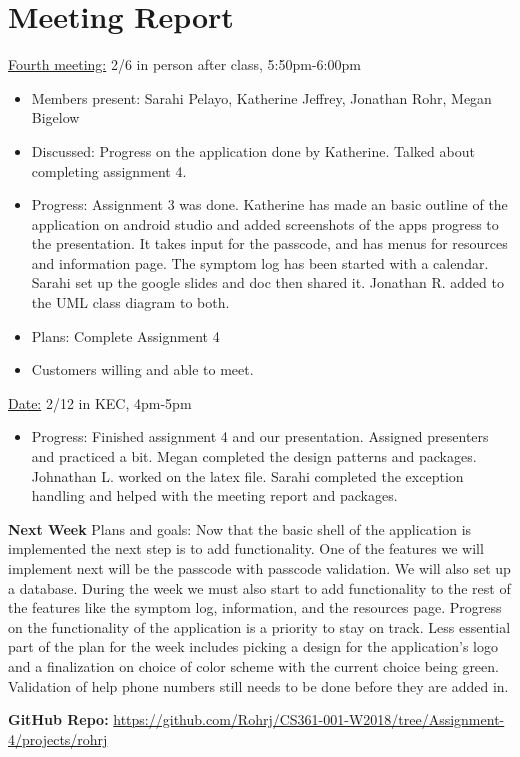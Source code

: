 \documentclass[letterpaper,12pt,titlepage]{article}
\begin{document}
\newpage
\section{Meeting Report}
\underline{Fourth meeting:} 2/6 in person after class, 5:50pm-6:00pm
\begin{itemize}
\item Members present: Sarahi Pelayo, Katherine Jeffrey, Jonathan Rohr, Megan Bigelow
\item Discussed: Progress on the application done by Katherine. Talked about completing assignment 4.
\item Progress: Assignment 3 was done. Katherine has made an basic outline of the application on android studio and added screenshots of the apps progress to the presentation. It takes input for the passcode, and has menus for resources and information page. The symptom log has been started with a calendar. Sarahi set up the google slides and doc then shared it. Jonathan R. added to the UML class diagram to both.
\item Plans: Complete Assignment 4
\item Customers willing and able to meet.

\end{itemize}
\noindent
\underline{Date:} 2/12 in KEC, 4pm-5pm
\begin{itemize}
\item Progress: Finished assignment 4 and our presentation. Assigned presenters and practiced a bit. Megan completed the design patterns and packages. Johnathan L. worked on the latex file. Sarahi completed the exception handling and helped with the meeting report and packages.
\end{itemize}

\noindent
\textbf{Next Week}
\newline
\newline
Plans and goals:
\noindent
\newline
\newline
Now that the basic shell of the application is implemented the next step is to add functionality. One of the features we will implement next will be the passcode with passcode validation. We will also set up a database. During the week we must also start to add functionality to the rest of the features like the symptom log, information, and the resources page. Progress on the functionality of the application is a priority to stay on track. Less essential part of the plan for the week includes picking a design for the application’s logo and a finalization on choice of color scheme with the current choice being green. Validation of help phone numbers still needs to be done before they are added in.
\newpage



\textbf{GitHub Repo:} \url{https://github.com/Rohrj/CS361-001-W2018/tree/Assignment-4/projects/rohrj}
\end{document}

